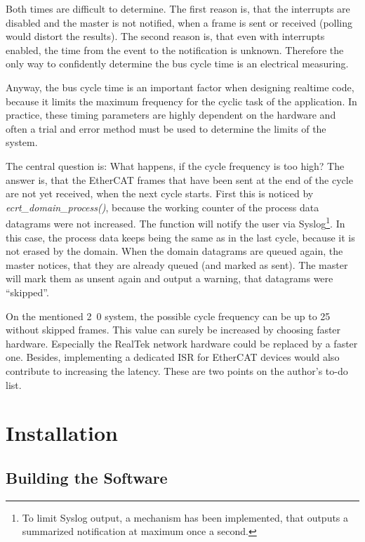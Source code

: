 \documentclass[a4paper,12pt,BCOR6mm,bibtotoc,idxtotoc]{scrbook}
\begin{document}
Both times are difficult to determine. The first reason is, that the
interrupts are disabled and the master is not notified, when a frame is sent
or received (polling would distort the results). The second reason is, that
even with interrupts enabled, the time from the event to the notification is
unknown. Therefore the only way to confidently determine the bus cycle time is
an electrical measuring.

Anyway, the bus cycle time is an important factor when designing realtime
code, because it limits the maximum frequency for the cyclic task of the
application.  In practice, these timing parameters are highly dependent on the
hardware and often a trial and error method must be used to determine the
limits of the system.

The central question is: What happens, if the cycle frequency is too high? The
answer is, that the EtherCAT frames that have been sent at the end of the
cycle are not yet received, when the next cycle starts.  First this is noticed
by \textit{ecrt\_domain\_process()}, because the working counter of the
process data datagrams were not increased. The function will notify the user
via Syslog\footnote{To limit Syslog output, a mechanism has been implemented,
that outputs a summarized notification at maximum once a second.}. In this
case, the process data keeps being the same as in the last cycle, because it
is not erased by the domain. When the domain datagrams are queued again, the
master notices, that they are already queued (and marked as sent). The master
will mark them as unsent again and output a warning, that datagrams were
``skipped''.

On the mentioned \unit{2.0}{\giga\hertz} system, the possible cycle frequency
can be up to \unit{25}{\kilo\hertz} without skipped frames. This value can
surely be increased by choosing faster hardware. Especially the RealTek
network hardware could be replaced by a faster one. Besides, implementing a
dedicated ISR for EtherCAT devices would also contribute to increasing the
latency. These are two points on the author's to-do list.


\chapter{Installation}
\label{sec:installation}

\section{Building the Software}
\end{document}
